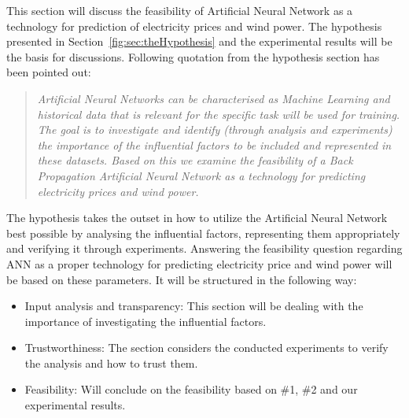 This section will discuss the feasibility of Artificial Neural Network as a technology for prediction of electricity prices and wind power. The hypothesis presented in Section~\ref{fig:sec:theHypothesis} and the experimental results will be the basis for discussions. Following quotation from the hypothesis section has been pointed out:

\begin{quotation}
\textit{Artificial Neural Networks can be characterised as Machine Learning\cite{18} and historical data that is relevant for the specific task will be used for training. The goal is to investigate and identify (through analysis and experiments) the importance of the influential factors to be included and represented in these datasets. Based on this we examine the feasibility of a Back Propagation Artificial Neural Network as a technology for predicting electricity prices and wind power.}
\end{quotation}

The hypothesis takes the outset in how to utilize the Artificial Neural Network best possible by analysing the influential factors, representing them appropriately and verifying it through experiments. Answering the feasibility question regarding ANN as a proper technology for predicting electricity price and wind power will be based on these parameters. It will be structured in the following way:

\begin{itemize}
\item Input analysis and transparency: This section will be dealing with the importance of investigating the influential factors.
\item Trustworthiness: The section considers the conducted experiments to verify the analysis and how to trust them.
\item Feasibility: Will conclude on the feasibility based on \#1, \#2 and our experimental results.
\end{itemize}


